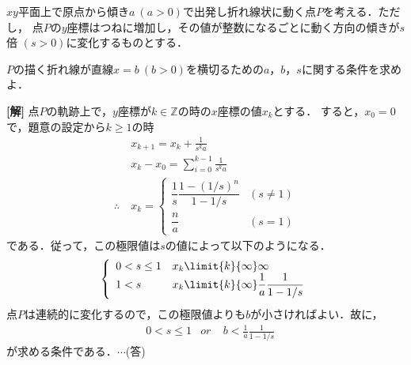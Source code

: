 \documentclass[a4j]{jarticle}
\begin{document}

     \begin{oframed}
     $xy$平面上で原点から傾き$a \ (a>0)$で出発し折れ線状に動く点$P$を考える．ただし，
     点$P$の$y$座標はつねに増加し，その値が整数になるごとに動く方向の傾きが$s$倍
     $(s>0)$に変化するものとする．
     
     $P$の描く折れ線が直線$x=b \ (b>0)$を横切るための$a$，$b$，$s$に関する条件を求めよ．
     \end{oframed}

\setlength{\columnseprule}{0.4pt}
\begin{multicols}{2}
{\bf[解]} 点$P$の軌跡上で，$y$座標が$k\in\mathbb{Z}$の時の$x$座標の値$x_k$とする．
すると，$x_0=0$で，題意の設定から$k\ge 1$の時
     \begin{align*}
     &x_{k+1}=x_k+\frac{1}{s^ka} \\ 
     &x_k-x_0=\sum_{i=0}^{k-1}\frac{1}{s^ka} \\
     \therefore \ 
     &x_k=\left\{
          \begin{array}{ll}
          \dfrac{1}{s}\dfrac{1-(1/s)^n}{1-1/s} & (s\not=1) \\
          \dfrac{n}{a} & (s=1)
          \end{array}
     \right.
     \end{align*}
である．従って，この極限値は$s$の値によって以下のようになる．
     \begin{align*}
     \left\{
          \begin{array}{ll}
          0<s\le 1 & x_k\limit{k}{\infty}\infty \\
          1<s        & x_k\limit{k}{\infty}\dfrac{1}{a}\dfrac{1}{1-1/s}
          \end{array}
     \right.
     \end{align*}
点$P$は連続的に変化するので，この極限値よりも$b$が小さければよい．故に，
     \begin{align*}
     &0<s\le1  &or \ \ \ \ \ b<\frac{1}{a}\frac{1}{1-1/s} 
     \end{align*}
が求める条件である．$\cdots$(答)
     
\newpage
\end{multicols}
\end{document}
